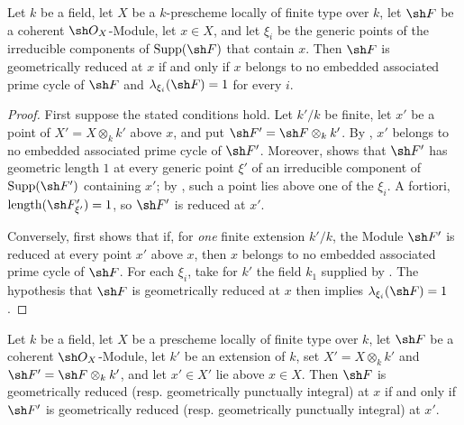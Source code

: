 \begin{proposition}[4.7.10]
\label{IV.4.7.10}
Let $k$ be a field, let $X$ be a $k$-prescheme locally of finite type
over $k$, let $\sh F$ be a coherent $\sh O_X$-Module, let $x\in X$,
and let $\xi_i$ be the generic points of the irreducible components
of $\operatorname{Supp}(\sh F)$ that contain $x$.
Then $\sh F$ is geometrically reduced at $x$
 if and only if $x$ belongs to no embedded associated
prime cycle of $\sh F$ and
$\lambda_{\xi_i}(\sh F)=1$ for every $i$.
\end{proposition}

\begin{proof}
First suppose the stated conditions hold.
Let $k'/k$ be finite, let $x'$ be a point of
$X'=X\otimes_k k'$ above $x$, and put
$\sh F'=\sh F\otimes_k k'$.
By , $x'$ belongs to no embedded associated prime cycle
of $\sh F'$.
Moreover,  shows that $\sh F'$ has geometric length
$1$ at every generic point $\xi'$ of an irreducible component of
$\operatorname{Supp}(\sh F')$ containing $x'$; by
, such a point lies above one of the $\xi_i$.
A fortiori,
$\operatorname{length}(\sh F'_{\xi'})=1$, so $\sh F'$ is reduced at
$x'$.

Conversely,  first shows that if, for \emph{one} finite
extension $k'/k$, the Module $\sh F'$ is reduced at every point $x'$
above $x$, then $x$ belongs to no embedded associated prime cycle of
$\sh F$.
For each $\xi_i$, take for $k'$ the field $k_1$ supplied by
.
The hypothesis that $\sh F$ is geometrically reduced at $x$ then
implies $\lambda_{\xi_i}(\sh F)=1$.
\end{proof}

\begin{proposition}[4.7.11]
\label{IV.4.7.11}
Let $k$ be a field, let $X$ be a prescheme locally of finite type
over $k$, let $\sh F$ be a coherent $\sh O_X$-Module, let $k'$ be an
extension of $k$, set $X'=X\otimes_k k'$ and
$\sh F'=\sh F\otimes_k k'$, and let $x'\in X'$ lie above $x\in X$.
Then $\sh F$ is geometrically reduced
\textup{(resp.} geometrically punctually integral\textup{)} at $x$ if and only if
$\sh F'$ is geometrically reduced
\textup{(resp.} geometrically punctually integral\textup{)} at $x'$.
\end{proposition}


